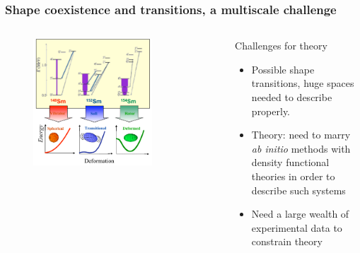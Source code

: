 \documentclass[compress]{beamer}
\begin{document}
\frame
{
  \frametitle{Shape coexistence and transitions, a multiscale challenge}

  \begin{footnotesize}
    \scriptsize{
    \begin{columns}
      \column{9.5cm}
      \begin{figure}[htp]
        \centering
        \includegraphics[width=0.75\textwidth]{Figures/witek6.pdf}
      \end{figure}


      \column{3.0cm}
      \begin{block}{Challenges for theory}
        \begin{itemize}
         \item Possible shape transitions, huge spaces needed to describe properly.
         \item Theory: need to marry {\em ab initio} methods with density functional theories in order to describe such systems 
         \item Need a large wealth of experimental data to constrain theory
         \end{itemize}
      \end{block}

    \end{columns}

    }
  \end{footnotesize}
}
\end{document}
